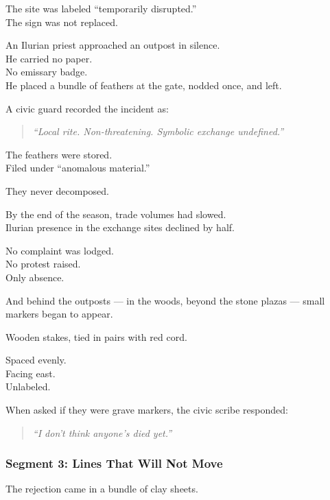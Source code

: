 \documentclass[9pt]{article}
\begin{document}
The site was labeled ``temporarily disrupted.”\\
The sign was not replaced.

\vspace{1em}

An Ilurian priest approached an outpost in silence.\\
He carried no paper.\\
No emissary badge.\\
He placed a bundle of feathers at the gate, nodded once, and left.

A civic guard recorded the incident as:

\begin{quote}
\textit{“Local rite. Non-threatening. Symbolic exchange undefined.”}
\end{quote}

The feathers were stored.\\
Filed under ``anomalous material.”

They never decomposed.

\vspace{1em}

By the end of the season, trade volumes had slowed.\\
Ilurian presence in the exchange sites declined by half.

No complaint was lodged.\\
No protest raised.\\
Only absence.

And behind the outposts — in the woods, beyond the stone plazas — small markers began to appear.

Wooden stakes, tied in pairs with red cord.

Spaced evenly.\\
Facing east.\\
Unlabeled.

When asked if they were grave markers, the civic scribe responded:

\begin{quote}
\textit{“I don’t think anyone’s died yet.”}
\end{quote}

\newpage

\subsubsection*{Segment 3: Lines That Will Not Move}

The rejection came in a bundle of clay sheets.
\end{document}
